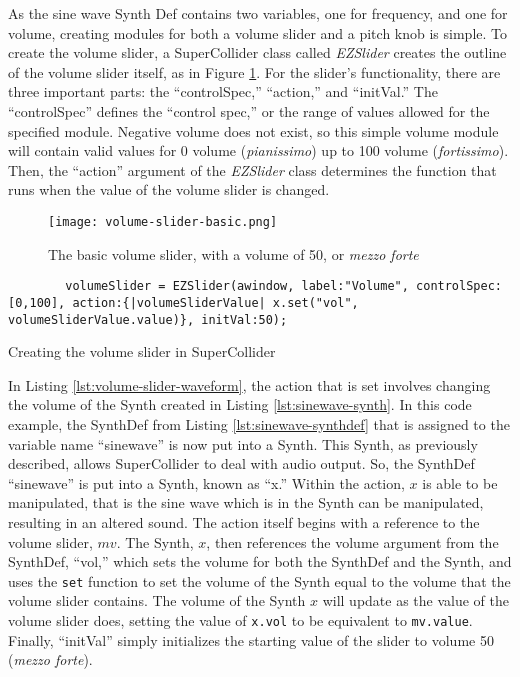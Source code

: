 As the sine wave Synth Def contains two variables, one for frequency, and one for volume, creating modules for both a volume slider and a pitch knob is simple. To create the volume slider, a SuperCollider class called \textit{EZSlider} creates the outline of the volume slider itself, as in Figure \ref{fig:volume-slider-basic}. For the slider's functionality, there are three important parts: the ``controlSpec,'' ``action,'' and ``initVal.'' The ``controlSpec'' defines the ``control spec,'' or the range of values allowed for the specified module. Negative volume does not exist, so this simple volume module will contain valid values for 0 volume (\textit{pianissimo}) up to 100 volume (\textit{fortissimo}). Then, the ``action'' argument of the \textit{EZSlider} class determines the function that runs when the value of the volume slider is changed. 

\begin{figure}[h]
  \centering
  \texttt{[image: volume-slider-basic.png]}
  \caption{The basic volume slider, with a volume of 50, or \textit{mezzo forte}}
  \label{fig:volume-slider-basic}
\end{figure}

\begin{listing}
	\begin{lstlisting}
		volumeSlider = EZSlider(awindow, label:"Volume", controlSpec:[0,100], action:{|volumeSliderValue| x.set("vol", volumeSliderValue.value)}, initVal:50);
	\end{lstlisting}
	\caption{Creating the volume slider in SuperCollider}
	\label{lst:volume-slider-waveform}
\end{listing}

In Listing \ref{lst:volume-slider-waveform}, the action that is set involves changing the volume of the Synth created in Listing \ref{lst:sinewave-synth}. In this code example, the SynthDef from Listing \ref{lst:sinewave-synthdef} that is assigned to the variable name ``sinewave'' is now put into a Synth. This Synth, as previously described, allows SuperCollider to deal with audio output. So, the SynthDef ``sinewave'' is put into a Synth, known as ``x.'' Within the action, $x$ is able to be manipulated, that is the sine wave which is in the Synth can be manipulated, resulting in an altered sound. The action itself begins with a reference to the volume slider, $mv$. The Synth, $x$, then references the volume argument from the SynthDef, ``vol,'' which sets the volume for both the SynthDef and the Synth, and uses the \texttt{set} function to set the volume of the Synth equal to the volume that the volume slider contains. The volume of the Synth $x$ will update as the value of the volume slider does, setting the value of \texttt{x.vol} to be equivalent to \texttt{mv.value}. Finally, ``initVal'' simply initializes the starting value of the slider to volume 50 (\textit{mezzo forte}).


